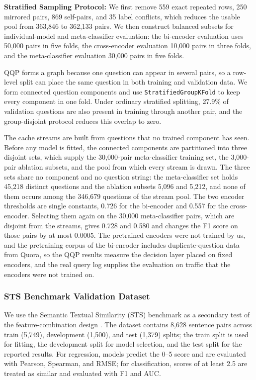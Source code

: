 \documentclass[authoryear,preprint,review,12pt]{elsarticle}
\begin{document}
\textbf{Stratified Sampling Protocol:}
We first remove 559 exact repeated rows, 250 mirrored pairs, 869 self-pairs, and 35 label conflicts, which reduces the usable pool from 363,846 to 362,133 pairs. We then construct balanced subsets for individual-model and meta-classifier evaluation: the bi-encoder evaluation uses 50,000 pairs in five folds, the cross-encoder evaluation 10,000 pairs in three folds, and the meta-classifier evaluation 30,000 pairs in five folds.

QQP forms a graph because one question can appear in several pairs, so a row-level split can place the same question in both training and validation data. We form connected question components and use \texttt{StratifiedGroupKFold} to keep every component in one fold. Under ordinary stratified splitting, 27.9\% of validation questions are also present in training through another pair, and the group-disjoint protocol reduces this overlap to zero.

The cache streams are built from questions that no trained component has seen. Before any model is fitted, the connected components are partitioned into three disjoint sets, which supply the 30,000-pair meta-classifier training set, the 3,000-pair ablation subsets, and the pool from which every stream is drawn. The three sets share no component and no question string: the meta-classifier set holds 45,218 distinct questions and the ablation subsets 5,096 and 5,212, and none of them occurs among the 346,679 questions of the stream pool. The two encoder thresholds are single constants, 0.726 for the bi-encoder and 0.557 for the cross-encoder. Selecting them again on the 30,000 meta-classifier pairs, which are disjoint from the streams, gives 0.728 and 0.580 and changes the F1 score on those pairs by at most 0.0005. The pretrained encoders were not trained by us, and the pretraining corpus of the bi-encoder includes duplicate-question data from Quora, so the QQP results measure the decision layer placed on fixed encoders, and the real query log supplies the evaluation on traffic that the encoders were not trained on.

\subsubsection{STS Benchmark Validation Dataset}
We use the Semantic Textual Similarity (STS) benchmark as a secondary test of the feature-combination design \citep{cer2017semeval}. The dataset contains 8,628 sentence pairs across train (5,749), development (1,500), and test (1,379) splits; the train split is used for fitting, the development split for model selection, and the test split for the reported results. For regression, models predict the 0--5 score and are evaluated with Pearson, Spearman, and RMSE; for classification, scores of at least 2.5 are treated as similar and evaluated with F1 and AUC.
\end{document}
